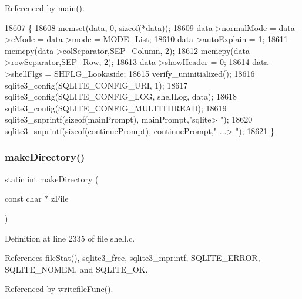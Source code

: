 Referenced by main().


\begin{DoxyCode}
18607                                         \{
18608   memset(data, 0, \textcolor{keyword}{sizeof}(*data));
18609   data->normalMode = data->cMode = data->mode = MODE_List;
18610   data->autoExplain = 1;
18611   memcpy(data->colSeparator,SEP_Column, 2);
18612   memcpy(data->rowSeparator,SEP_Row, 2);
18613   data->showHeader = 0;
18614   data->shellFlgs = SHFLG_Lookaside;
18615   verify_uninitialized();
18616   sqlite3_config(SQLITE_CONFIG_URI, 1);
18617   sqlite3_config(SQLITE_CONFIG_LOG, shellLog, data);
18618   sqlite3_config(SQLITE_CONFIG_MULTITHREAD);
18619   sqlite3_snprintf(\textcolor{keyword}{sizeof}(mainPrompt), mainPrompt,\textcolor{stringliteral}{"sqlite> "});
18620   sqlite3_snprintf(\textcolor{keyword}{sizeof}(continuePrompt), continuePrompt,\textcolor{stringliteral}{"   ...> "});
18621 \}
\end{DoxyCode}
\mbox{\label{shell_8c_a6e314bdf95720609135e34b2215392b7}} 
\subsubsection{make\+Directory()}
{\footnotesize\ttfamily static int make\+Directory (\begin{DoxyParamCaption}\item[{const char $\ast$}]{z\+File }\end{DoxyParamCaption})\hspace{0.3cm}{\ttfamily [static]}}



Definition at line 2335 of file shell.\+c.



References file\+Stat(), sqlite3\+\_\+free, sqlite3\+\_\+mprintf, S\+Q\+L\+I\+T\+E\+\_\+\+E\+R\+R\+OR, S\+Q\+L\+I\+T\+E\+\_\+\+N\+O\+M\+EM, and S\+Q\+L\+I\+T\+E\+\_\+\+OK.



Referenced by writefile\+Func().


